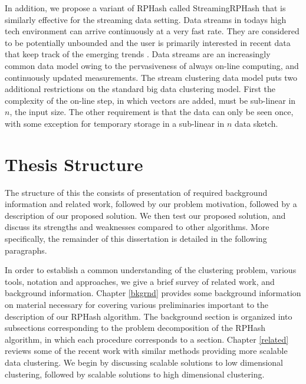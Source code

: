 In addition, we propose a variant of \textsf{RPHash} called \textsf{StreamingRPHash} that is similarly effective for the
streaming data setting.  Data streams in todays high tech environment can arrive continuously at a very fast rate.  They
are considered to be potentially unbounded and the user is primarily interested in recent data that keep track of the
emerging trends \cite{silva-13,braverman, shindler,aggarwal}.  Data streams are an increasingly common data model
owing to the pervasiveness of always on-line computing, and continuously updated measurements.  The stream clustering
data model puts two additional restrictions on the standard big data clustering model. First the complexity of the 
on-line step, in which vectors are added, must be sub-linear in $n$, the input size. The other requirement is that the
data can only be seen once, with some exception for temporary storage in a sub-linear in $n$ data sketch.

\section{Thesis Structure}
The structure of this the consists of presentation of required background information and related work, followed by 
our problem motivation, followed by a description of our proposed solution. We then test our proposed solution, and
discuss its strengths and weaknesses compared to other algorithms. More specifically, the remainder of this dissertation 
is detailed in the following paragraphs. 

In order to establish a common understanding of the clustering problem, various tools, notation and approaches, we give
a brief survey of related work, and background information.  Chapter \ref{bkgrnd} provides some background information
on material necessary for covering various preliminaries important to the description of our \textsf{RPHash} algorithm. 
The background section is organized into subsections corresponding to the problem decomposition of the \textsf{RPHash} algorithm,
in which each procedure corresponds to a section.
Chapter \ref{related} reviews some of the recent work with similar methods providing more scalable data clustering. 
We begin by discussing scalable solutions to low dimensional clustering, followed by scalable solutions to high dimensional
clustering.


